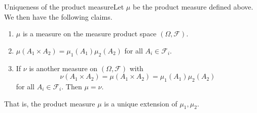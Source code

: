 \documentclass[twoside]{article}
\newcommand{\sigmalgebra}{\mathcal{F}}
\begin{document}
\begin{proposition_exam}{Uniqueness of the product measure}{}Let $\mu$ be the product measure defined above. We then have the following claims.

\begin{enumerate}
\item $\mu$ is a measure on the measure product space $(\Omega, \sigmalgebra)$.
\item $\mu(A_1 \times A_2) = \mu_1(A_1)\mu_2(A_2)$ for all $A_i \in \sigmalgebra_i$.
\item If $\nu$ is another measure on $(\Omega, \sigmalgebra)$ with 
$$
\nu(A_1 \times A_2) = \mu(A_1 \times A_2) = \mu_1(A_1)\mu_2(A_2)
$$
for all $A_i \in \sigmalgebra_i$. Then $\mu = \nu.$
\end{enumerate}

That is, the product measure $\mu$ is a unique extension of $\mu_1, \mu_2.$
\end{proposition_exam}
\end{document}
